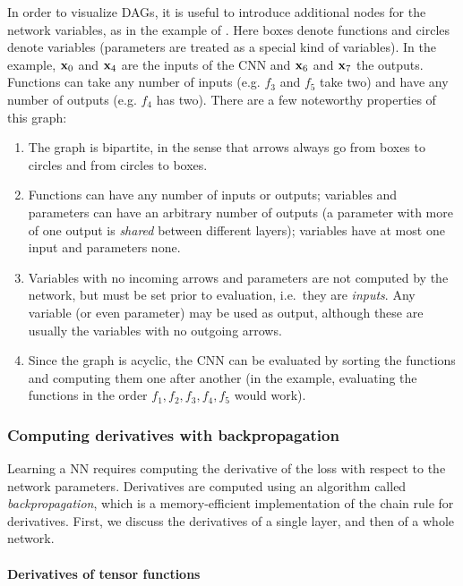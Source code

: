 In order to visualize DAGs, it is useful to introduce additional nodes for the network variables, as in the  example of . Here boxes denote functions and circles denote variables (parameters are treated as a special kind of variables). In the example, $\mathbf{x}_0$ and $\mathbf{x}_4$ are the inputs of the CNN and $\mathbf{x}_6$ and $\mathbf{x}_7$ the outputs. Functions can take any number of inputs (e.g. $f_3$ and $f_5$ take two) and have any number of outputs (e.g. $f_4$ has two). There are a few noteworthy properties of this graph:

\begin{enumerate}
	\item The graph is bipartite, in the sense that arrows always go from boxes to circles and from circles to boxes. 
	\item Functions can have any number of inputs or outputs; variables and parameters can have an arbitrary number of outputs (a parameter with more of one output is \emph{shared} between different layers); variables have at most one input and parameters none. 
	\item Variables with no incoming arrows and parameters are not computed by the network, but must be set prior to evaluation, i.e.\ they are \emph{inputs}. Any variable (or even parameter) may be used as output, although these are usually the variables with no outgoing arrows.
	\item Since the graph is acyclic, the CNN can be evaluated by sorting the functions and computing them one after another (in the example, evaluating the functions in the order $f_1,f_2,f_3,f_4,f_5$ would work).
\end{enumerate}

\subsubsection{Computing derivatives with backpropagation}\label{s:back}

Learning a NN requires computing the derivative of the loss with respect to the network parameters. Derivatives are computed using an algorithm called \emph{backpropagation}, which is a memory-efficient implementation of the chain rule for derivatives. First, we discuss the derivatives of a single layer, and then of a whole network.

\paragraph{Derivatives of tensor functions}

